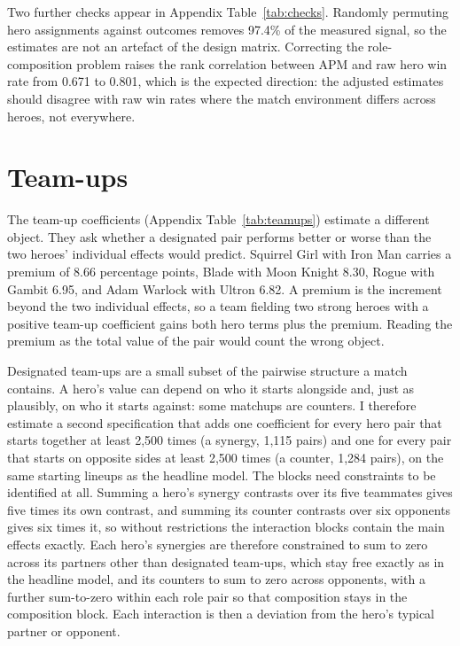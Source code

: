 \documentclass[11pt]{article}
\begin{document}
Two further checks appear in Appendix Table~\ref{tab:checks}. Randomly permuting hero
assignments against outcomes removes 97.4\% of the measured signal, so the estimates are
not an artefact of the design matrix. Correcting the role-composition problem raises the rank
correlation between APM and raw hero win rate from 0.671 to 0.801, which
is the expected direction: the adjusted estimates should disagree with raw win rates where the
match environment differs across heroes, not everywhere.

\FloatBarrier
\section*{Team-ups}

The team-up coefficients (Appendix Table~\ref{tab:teamups}) estimate a different object. They
ask whether a designated pair performs better or worse than the two heroes' individual effects
would predict. Squirrel Girl with Iron Man carries a premium of 8.66 percentage points, Blade
with Moon Knight 8.30, Rogue with Gambit 6.95, and Adam Warlock with Ultron 6.82. A
premium is the increment beyond the two individual effects, so a team fielding two strong heroes
with a positive team-up coefficient gains both hero terms plus the premium. Reading the premium
as the total value of the pair would count the wrong object.

Designated team-ups are a small subset of the pairwise structure a match contains. A hero's
value can depend on who it starts alongside and, just as plausibly, on who it starts against:
some matchups are counters. I therefore estimate a second specification that adds one
coefficient for every hero pair that starts together at least 2,500 times (a synergy,
1,115 pairs) and one for every pair that starts on opposite sides at least 2,500
times (a counter, 1,284 pairs), on the same starting lineups as the headline model. The
blocks need constraints to be identified at all. Summing a hero's synergy contrasts over its
five teammates gives five times its own contrast, and summing its counter contrasts over six
opponents gives six times it, so without restrictions the interaction blocks contain the main
effects exactly. Each hero's synergies are therefore constrained to sum to zero across its
partners other than designated team-ups, which stay free exactly as in the headline model, and
its counters to sum to zero across opponents, with a further sum-to-zero within each role pair
so that composition stays in the composition block. Each interaction is then a deviation from
the hero's typical partner or opponent.
\end{document}
